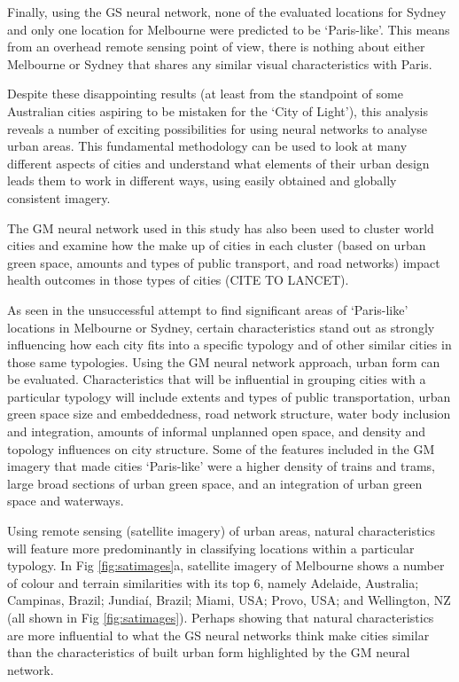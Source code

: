 \documentclass[10pt,letterpaper]{article}
\begin{document}
Finally, using the GS neural network, none of the evaluated locations for Sydney and only one location for Melbourne were predicted to be `Paris-like'. This means from an overhead remote sensing point of view, there is nothing about either Melbourne or Sydney that shares any similar visual characteristics with Paris.

Despite these disappointing results (at least from the standpoint of some Australian cities aspiring to be mistaken for the `City of Light'), this analysis reveals a number of exciting possibilities for using neural networks to analyse urban areas. This fundamental methodology can be used to look at many different aspects of cities and understand what elements of their urban design leads them to work in different ways, using easily obtained and globally consistent imagery. 

The GM neural network used in this study has also been used to cluster world cities and examine how the make up of cities in each cluster (based on urban green space, amounts and types of public transport, and road networks) impact health outcomes in those types of cities (CITE TO LANCET). 

As seen in the unsuccessful attempt to find significant areas of `Paris-like' locations in Melbourne or Sydney, certain characteristics stand out as strongly influencing how each city fits into a specific typology and of other similar cities in those same typologies. Using the GM neural network approach, urban form can be evaluated. Characteristics that will be influential in grouping cities with a particular typology will include extents and types of public transportation, urban green space size and embeddedness, road network structure, water body inclusion and integration, amounts of informal unplanned open space, and density and topology influences on city structure. Some of the features included in the GM imagery that made cities `Paris-like' were a higher density of trains and trams, large broad sections of urban green space, and an integration of urban green space and waterways.


Using remote sensing (satellite imagery) of urban areas, natural characteristics will feature more predominantly in classifying locations within a particular typology. In Fig \ref{fig:satimages}a, satellite imagery of Melbourne shows a number of colour and terrain similarities with its top 6, namely Adelaide, Australia; Campinas, Brazil; Jundia\'{i}, Brazil; Miami, USA; Provo, USA; and Wellington, NZ (all shown in Fig \ref{fig:satimages}). Perhaps showing that natural characteristics are more influential to what the GS neural networks think make cities similar than the characteristics of built urban form highlighted by the GM neural network.
\end{document}
